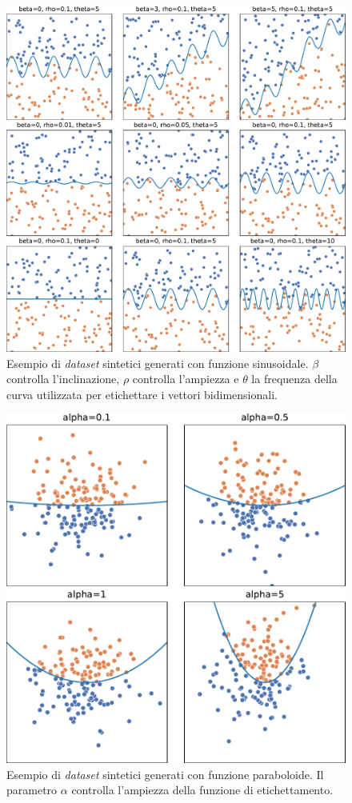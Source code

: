 \begin{figure}
    \centering
    \includegraphics[width=\linewidth]{img/sinusoid_dataset_param_influence.pdf}
    \caption[Esempio di \emph{dataset} sintetici generati con funzione sinusoidale.]{Esempio di \emph{dataset} sintetici generati con funzione sinusoidale. 
    $\beta$ controlla l'inclinazione, $\rho$ controlla l'ampiezza e $\theta$ la frequenza della curva utilizzata per etichettare i vettori bidimensionali.}
    \label{fig:sinusoid_dataset}
\end{figure}
\begin{figure}
    \centering
    \includegraphics[width=.7\linewidth]{img/pacman_dataset_param_influence.pdf}
    \caption[Esempio di \emph{dataset} sintetici generati con funzione paraboloide.]{Esempio di \emph{dataset} sintetici generati con funzione paraboloide. Il parametro $\alpha$ controlla l'ampiezza della funzione di etichettamento.}
    \label{fig:pacman_dataset}
\end{figure}
